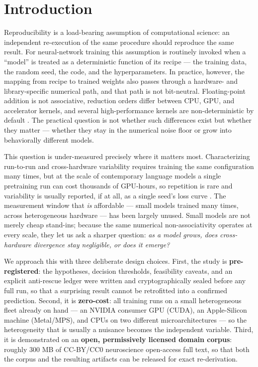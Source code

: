 \documentclass{article}
\begin{document}
\section{Introduction}
Reproducibility is a load-bearing assumption of computational science: an independent
re-execution of the same procedure should reproduce the same result. For neural-network
training this assumption is routinely invoked when a ``model'' is treated as a deterministic
function of its recipe --- the training data, the random seed, the code, and the
hyperparameters. In practice, however, the mapping from recipe to trained weights also
passes through a hardware- and library-specific numerical path, and that path is not
bit-neutral. Floating-point addition is not associative, reduction orders differ between
CPU, GPU, and accelerator kernels, and several high-performance kernels are non-deterministic
by default \citep{goldberg1991,pytorch_repro,nvidia_determinism}. The practical
question is not whether such differences exist but whether they matter --- whether they stay
in the numerical noise floor or grow into behaviorally different models.

This question is under-measured precisely where it matters most. Characterizing run-to-run
and cross-hardware variability requires training the same configuration many times, but at
the scale of contemporary language models a single pretraining run can cost thousands of
GPU-hours, so repetition is rare and variability is usually reported, if at all, as a single
seed's loss curve \citep{bouthillier2021,kaplan2020}. The measurement window that \emph{is}
affordable --- small models trained many times, across heterogeneous hardware --- has been
largely unused. Small models are not merely cheap stand-ins; because the same numerical
non-associativity operates at every scale, they let us ask a sharper question: \emph{as a model
grows, does cross-hardware divergence stay negligible, or does it emerge?}

We approach this with three deliberate design choices. First, the study is \textbf{pre-registered}:
the hypotheses, decision thresholds, feasibility caveats, and an explicit anti-rescue ledger
were written and cryptographically sealed before any full run, so that a surprising result
cannot be retrofitted into a confirmed prediction. Second, it is \textbf{zero-cost}: all training
runs on a small heterogeneous fleet already on hand --- an NVIDIA consumer GPU (CUDA), an
Apple-Silicon machine (Metal/MPS), and CPUs on two different microarchitectures --- so the
heterogeneity that is usually a nuisance becomes the independent variable. Third, it is
demonstrated on an \textbf{open, permissively licensed domain corpus}: roughly 300 MB of
CC-BY/CC0 neuroscience open-access full text, so that both the corpus and the resulting
artifacts can be released for exact re-derivation.
\end{document}

